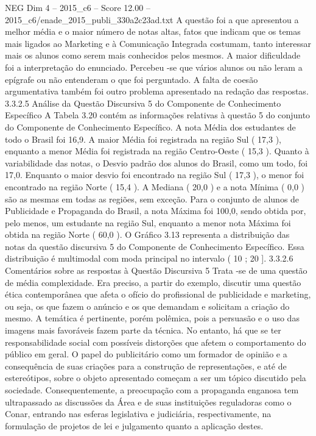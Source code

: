 \begin{textsample}{NEG Dim 4 – 2015\_c6 – Score 12.00 – 2015\_c6/enade\_2015\_publi\_330a2c23ad.txt}
A questão foi a que apresentou a melhor média e o maior número de notas altas, fatos que indicam que os temas mais ligados ao Marketing e à Comunicação Integrada costumam, tanto interessar mais os alunos como serem mais conhecidos pelos mesmos.
A maior dificuldade foi a interpretação do enunciado.
Percebeu -se que vários alunos ou não leram a epígrafe ou não entenderam o que foi perguntado.
A falta de coesão argumentativa também foi outro problema apresentado na redação das respostas. 3.3.2.5 Análise da Questão Discursiva 5 do Componente de Conhecimento Específico A Tabela 3.20 contém as informações relativas à questão 5 do conjunto do Componente de Conhecimento Específico.
A nota Média dos estudantes de todo o Brasil foi 16,9.
A maior Média foi registrada na região Sul ( 17,3 ), enquanto a menor Média foi registrada na região Centro-Oeste ( 15,3 ).
Quanto à variabilidade das notas, o Desvio padrão dos alunos do Brasil, como um todo, foi 17,0.
Enquanto o maior desvio foi encontrado na região Sul ( 17,3 ), o menor foi encontrado na região Norte ( 15,4 ).
A Mediana ( 20,0 ) e a nota Mínima ( 0,0 ) são as mesmas em todas as regiões, sem exceção.
Para o conjunto de alunos de Publicidade e Propaganda do Brasil, a nota Máxima foi 100,0, sendo obtida por, pelo menos, um estudante na região Sul, enquanto a menor nota Máxima foi obtida na região Norte ( 60,0 ).
O Gráfico 3.13 representa a distribuição das notas da questão discursiva 5 do Componente de Conhecimento Específico.
Essa distribuição é multimodal com moda principal no intervalo ( 10 ; 20 ]. 3.3.2.6 Comentários sobre as respostas à Questão Discursiva 5 Trata -se de uma questão de média complexidade.
Era preciso, a partir do exemplo, discutir uma questão ética contemporânea que afeta o ofício do profissional de publicidade e marketing, ou seja, os que fazem o anúncio e os que demandam e solicitam a criação do mesmo.
A temática é pertinente, porém polêmica, pois a persuasão e o uso das imagens mais favoráveis fazem parte da técnica.
No entanto, há que se ter responsabilidade social com possíveis distorções que afetem o comportamento do público em geral.
O papel do publicitário como um formador de opinião e a consequência de suas criações para a construção de representações, e até de estereótipos, sobre o objeto apresentado começam a ser um tópico discutido pela sociedade.
Consequentemente, a preocupação com a propaganda enganosa tem ultrapassado as discussões da Área e de suas instituições reguladoras como o Conar, entrando nas esferas legislativa e judiciária, respectivamente, na formulação de projetos de lei e julgamento quanto a aplicação destes.

\end{textsample}
